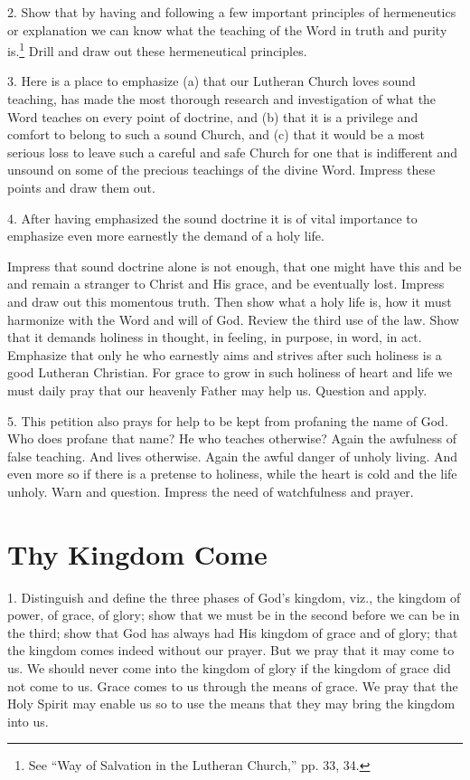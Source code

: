 2. Show that by having and following a few important principles of hermeneutics or explanation we can know what the teaching of the Word in truth and purity is.\footnote{See “Way of Salvation in the Lutheran Church,” pp. 33, 34.} Drill and draw out these hermeneutical principles.

 3. Here is a place to emphasize (a) that our Lutheran Church loves sound teaching, has made the most thorough research and investigation of what the Word teaches on every point of doctrine, and (b) that it is a privilege and comfort to belong to such a sound Church, and (c) that it would be a most serious loss to leave such a careful and safe Church for one that is indifferent and unsound on some of the precious teachings of the divine Word. Impress these points and draw them out.

4. After having emphasized the sound doctrine it is of vital importance to emphasize even more earnestly the demand of a holy life.

 Impress that sound doctrine alone is not enough, that one might have this and be and remain a stranger to Christ and His grace, and be eventually lost. Impress and draw out this momentous truth. Then show what a holy life is, how it must harmonize with the Word and will of God. Review the third use of the law. Show that it demands holiness in thought, in feeling, in purpose, in word, in act. Emphasize that only he who earnestly aims and strives after such holiness is a good Lutheran Christian. For grace to grow in such holiness of heart and life we must daily pray that our heavenly Father may help us. Question and apply.

5. This petition also prays for help to be kept from profaning the name of God. Who does profane that name? He who teaches otherwise? Again the awfulness of false teaching. And lives otherwise. Again the awful danger of unholy living. And even more so if there is a pretense to holiness, while the heart is cold and the life unholy. Warn and question. Impress the need of watchfulness and prayer.

\section{Thy Kingdom Come}

1. Distinguish and define the three phases of
 God’s kingdom, viz., the kingdom of power, of grace, of glory; show that we must be in the second before we can be in the third; show that God has always had His kingdom of grace and of glory; that the kingdom comes indeed without our prayer. But we pray that it may come to us. We should never come into the kingdom of glory if the kingdom of grace did not come to us. Grace comes to us through the means of grace. We pray that the Holy Spirit may enable us so to use the means that they may bring the kingdom into us.

